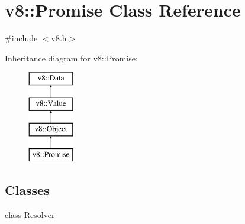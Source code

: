 \hypertarget{classv8_1_1_promise}{}\section{v8\+:\+:Promise Class Reference}
\label{classv8_1_1_promise}


{\ttfamily \#include $<$v8.\+h$>$}

Inheritance diagram for v8\+:\+:Promise\+:\begin{figure}[H]
\begin{center}
\leavevmode
\includegraphics[height=4.000000cm]{classv8_1_1_promise}
\end{center}
\end{figure}
\subsection*{Classes}
\begin{DoxyCompactItemize}
\item 
class \hyperlink{classv8_1_1_promise_1_1_resolver}{Resolver}
\end{DoxyCompactItemize}
